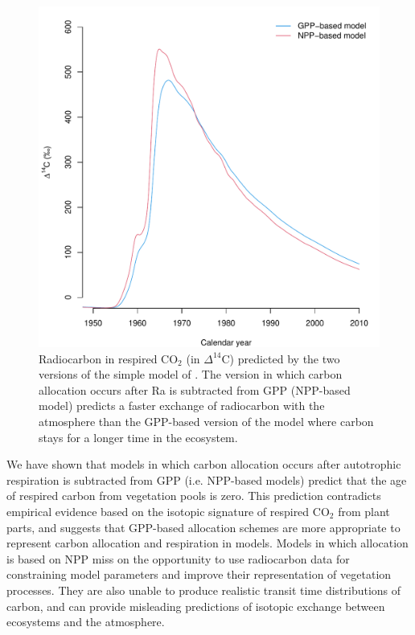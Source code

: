 \documentclass[bg, manuscript]{copernicus}
\begin{document}
\begin{figure}[t]
   \centering
   \includegraphics[scale=0.9]{radiocarbon.pdf} %
   \caption{Radiocarbon in respired CO$_2$ (in $\Delta^{14}$C) predicted by the two versions of the simple model of \citet{Emanuel1981}. The version in which carbon allocation occurs after Ra is subtracted from GPP (NPP-based model) predicts a faster exchange of radiocarbon with the atmosphere than the GPP-based version of the model where carbon stays for a longer time in the ecosystem.}
   \label{fig:radiocarbon}
\end{figure}


We have shown that models in which carbon allocation occurs after autotrophic respiration is subtracted from GPP (i.e. NPP-based models) predict that the age of respired carbon from vegetation pools is zero. This prediction contradicts empirical evidence based on the isotopic signature of respired CO$_2$ from plant parts, and suggests that GPP-based allocation schemes are more appropriate to represent carbon allocation and respiration in models. Models in which allocation is based on NPP miss on the opportunity to use radiocarbon data for constraining model parameters and improve their representation of vegetation processes. They are also unable to produce realistic transit time distributions of carbon, and can provide misleading predictions of isotopic exchange between ecosystems and the atmosphere. 
\end{document}
